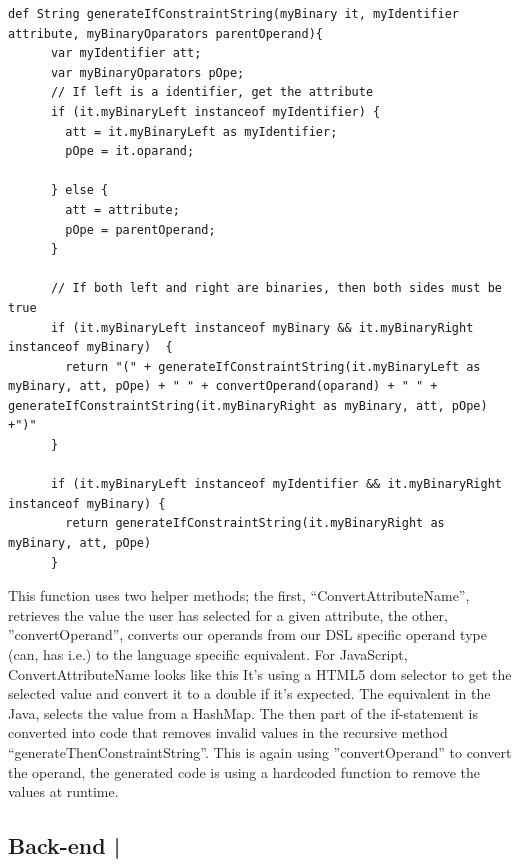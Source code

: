 \documentclass[paper=a4, fontsize=11pt]{scrartcl} %
\numberwithin{equation}{section} %
\numberwithin{figure}{section} %
\numberwithin{table}{section} %
\begin{document}
\begin{lstlisting}
def String generateIfConstraintString(myBinary it, myIdentifier attribute, myBinaryOparators parentOperand){
      var myIdentifier att;
      var myBinaryOparators pOpe;
      // If left is a identifier, get the attribute
      if (it.myBinaryLeft instanceof myIdentifier) {
        att = it.myBinaryLeft as myIdentifier;
        pOpe = it.oparand;
        
      } else {
        att = attribute;
        pOpe = parentOperand;
      }
      
      // If both left and right are binaries, then both sides must be true
      if (it.myBinaryLeft instanceof myBinary && it.myBinaryRight instanceof myBinary)  {
        return "(" + generateIfConstraintString(it.myBinaryLeft as myBinary, att, pOpe) + " " + convertOperand(oparand) + " " + generateIfConstraintString(it.myBinaryRight as myBinary, att, pOpe) +")"
      }
      
      if (it.myBinaryLeft instanceof myIdentifier && it.myBinaryRight instanceof myBinary) {
        return generateIfConstraintString(it.myBinaryRight as myBinary, att, pOpe)
      }

\end{lstlisting}
This function uses two helper methods; the first, “ConvertAttributeName”, retrieves the value the user has selected for a given attribute, the other, ”convertOperand”, converts our operands from our DSL specific operand type (can, has i.e.) to the language specific equivalent.
For JavaScript, ConvertAttributeName looks like this
It’s using a HTML5 dom selector to get the selected value and convert it to a double if it’s expected.
The equivalent in the Java, selects the value from a HashMap.
The then part of the if-statement is converted into code that removes invalid values in the recursive method “generateThenConstraintString”. This is again using ”convertOperand” to convert the operand, the generated code is using a hardcoded function to remove the values at runtime.
\subsection{Back-end |}
\end{document}
